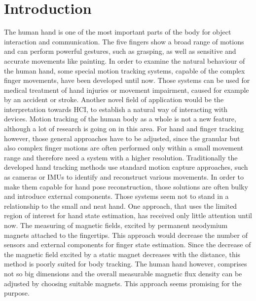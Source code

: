 
\lhead[\chaptername~\thechapter]{\rightmark}


\rhead[\leftmark]{}


\lfoot[\thepage]{}


\cfoot{}


\rfoot[]{\thepage}


\chapter{Introduction}

The human hand is one of the most important parts of the body for object interaction and communication. The five fingers show a broad range of motions and can perform powerful gestures, such as grasping, as well as sensitive and accurate movements like painting. In order to examine the natural behaviour of the human hand, some special motion tracking systems, capable of the complex finger movements, have been developed until now. Those systems can be used for medical treatment of hand injuries or movement impairment, caused for example by an accident or stroke. Another novel field of application would be the interpretation towards \ac{HCI}, to establish a natural way of interacting with devices. Motion tracking of the human body as a whole is not a new feature, although a lot of research is going on in this area. For hand and finger tracking however, those general approaches have to be adjusted, since the granular but also complex finger motions are often performed only within a small movement range and therefore need a system with a higher resolution. Traditionally the developed hand tracking methods use standard motion capture approaches, such as cameras or \acp{IMU} to identify and reconstruct various movements. In order to make them capable for hand pose reconstruction, those solutions are often bulky and introduce external components. Those systems seem not to stand in a relationship to the small and neat hand. One approach, that uses the limited region of interest for hand state estimation, has received only little attention until now. The measuring of magnetic fields, excited by permanent neodymium magnets attached to the fingertips. This approach would decrease the number of sensors and external components for finger state estimation. Since the decrease of the magnetic field excited by a static magnet decreases with the distance, this method is poorly suited for body tracking. The human hand however, comprises not so big dimensions and the overall measurable magnetic flux density can be adjusted by choosing suitable magnets. This approach seems promising for the purpose.

